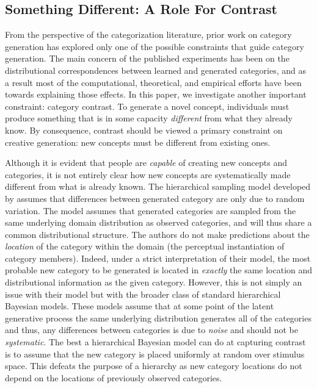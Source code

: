 \documentclass[12pt]{article}
\begin{document}
\begin{flushleft}
\subsection{Something Different: A Role For Contrast}

From the perspective of the categorization literature, prior work on category generation has explored only one of the possible constraints that guide category generation. The main concern of the published experiments has been on the distributional correspondences between learned and generated categories, and as a result most of the computational, theoretical, and empirical efforts have been towards explaining those effects. In this paper, we investigate another important constraint: category contrast. To generate a novel concept, individuals must produce something that is in some capacity {\em different} from what they already know. By consequence, contrast should be viewed a primary constraint on creative generation: new concepts must be different from existing ones. 

Although it is evident that people are {\em capable} of creating new concepts and categories, it is not entirely clear how new concepts are systematically made different from what is already known. The hierarchical sampling model developed by \cite{jern2013probabilistic} assumes that differences between generated category are only due to random variation. The model assumes that generated categories are sampled from the same underlying domain distribution as observed categories, and will thus share a common distributional structure. The authors do not make predictions about the {\em location} of the category within the domain (the perceptual instantiation of category members). Indeed, under a strict interpretation of their model, the most probable new category to be generated is located in {\em exactly} the same location and distributional information as the given category. However, this is not simply an issue with their model but with the broader class of standard hierarchical Bayesian models. These models assume that at some point of the latent generative process the same underlying distribution generates all of the categories and thus, any differences between categories is due to {\em noise} and should not be {\em systematic}. The best a hierarchical Bayesian model can do at capturing contrast is to assume that the new category is placed uniformly at random over stimulus space. This defeats the purpose of a hierarchy as new category locations do not depend on the locations of previously observed categories.


\end{flushleft}
\end{document}
